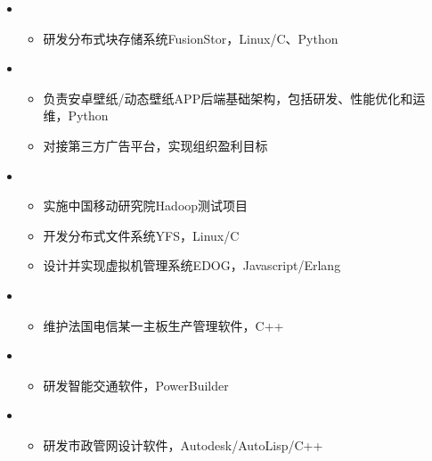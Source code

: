 \begin{itemize}[leftmargin=*]
    \item 
        {\small
        \begin{itemize}
            \item 研发分布式块存储系统FusionStor，Linux/C、Python
        \end{itemize}
        }
    \item
        {\small
        \begin{itemize}
            \item 负责安卓壁纸/动态壁纸APP后端基础架构，包括研发、性能优化和运维，Python
            \item 对接第三方广告平台，实现组织盈利目标
        \end{itemize}
        }
    \item
        {\small
        \begin{itemize}
            \item 实施中国移动研究院Hadoop测试项目
            \item 开发分布式文件系统YFS，Linux/C
            \item 设计并实现虚拟机管理系统EDOG，Javascript/Erlang
        \end{itemize}
        }
    \item 
        {\small
        \begin{itemize}
            \item 维护法国电信某一主板生产管理软件，C++
        \end{itemize}
        }
    \item 
        {\small
        \begin{itemize}
            \item 研发智能交通软件，PowerBuilder
        \end{itemize}
        }
    \item 
        {\small
        \begin{itemize}
            \item 研发市政管网设计软件，Autodesk/AutoLisp/C++
        \end{itemize}
        }
\end{itemize}
